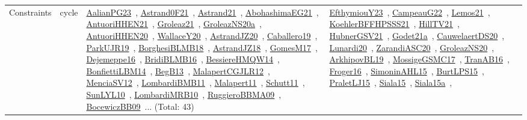 {\begin{longtable}{lp{3cm}>{\raggedright\arraybackslash}p{6cm}>{\raggedright\arraybackslash}p{6cm}>{\raggedright\arraybackslash}p{8cm}}
Constraints & cycle & \href{../works/AalianPG23.pdf}{AalianPG23}~\cite{AalianPG23}, \href{../works/Astrand0F21.pdf}{Astrand0F21}~\cite{Astrand0F21}, \href{../works/Astrand21.pdf}{Astrand21}~\cite{Astrand21}, \href{../works/AbohashimaEG21.pdf}{AbohashimaEG21}~\cite{AbohashimaEG21}, \href{../works/AntuoriHHEN21.pdf}{AntuoriHHEN21}~\cite{AntuoriHHEN21}, \href{../works/Groleaz21.pdf}{Groleaz21}~\cite{Groleaz21}, \href{../works/GroleazNS20a.pdf}{GroleazNS20a}~\cite{GroleazNS20a}, \href{../works/AntuoriHHEN20.pdf}{AntuoriHHEN20}~\cite{AntuoriHHEN20}, \href{../works/WallaceY20.pdf}{WallaceY20}~\cite{WallaceY20}, \href{../works/AstrandJZ20.pdf}{AstrandJZ20}~\cite{AstrandJZ20}, \href{../works/Caballero19.pdf}{Caballero19}~\cite{Caballero19}, \href{../works/ParkUJR19.pdf}{ParkUJR19}~\cite{ParkUJR19}, \href{../works/BorghesiBLMB18.pdf}{BorghesiBLMB18}~\cite{BorghesiBLMB18}, \href{../works/AstrandJZ18.pdf}{AstrandJZ18}~\cite{AstrandJZ18}, \href{../works/GomesM17.pdf}{GomesM17}~\cite{GomesM17}, \href{../works/Dejemeppe16.pdf}{Dejemeppe16}~\cite{Dejemeppe16}, \href{../works/BridiBLMB16.pdf}{BridiBLMB16}~\cite{BridiBLMB16}, \href{../works/BessiereHMQW14.pdf}{BessiereHMQW14}~\cite{BessiereHMQW14}, \href{../works/BonfiettiLBM14.pdf}{BonfiettiLBM14}~\cite{BonfiettiLBM14}, \href{../works/BegB13.pdf}{BegB13}~\cite{BegB13}, \href{../works/MalapertCGJLR12.pdf}{MalapertCGJLR12}~\cite{MalapertCGJLR12}, \href{../works/MenciaSV12.pdf}{MenciaSV12}~\cite{MenciaSV12}, \href{../works/LombardiBMB11.pdf}{LombardiBMB11}~\cite{LombardiBMB11}, \href{../works/Malapert11.pdf}{Malapert11}~\cite{Malapert11}, \href{../works/Schutt11.pdf}{Schutt11}~\cite{Schutt11}, \href{../works/SunLYL10.pdf}{SunLYL10}~\cite{SunLYL10}, \href{../works/LombardiMRB10.pdf}{LombardiMRB10}~\cite{LombardiMRB10}, \href{../works/RuggieroBBMA09.pdf}{RuggieroBBMA09}~\cite{RuggieroBBMA09}, \href{../works/BocewiczBB09.pdf}{BocewiczBB09}~\cite{BocewiczBB09}... (Total: 43) & \href{../works/EfthymiouY23.pdf}{EfthymiouY23}~\cite{EfthymiouY23}, \href{../works/CampeauG22.pdf}{CampeauG22}~\cite{CampeauG22}, \href{../works/Lemos21.pdf}{Lemos21}~\cite{Lemos21}, \href{../works/KoehlerBFFHPSSS21.pdf}{KoehlerBFFHPSSS21}~\cite{KoehlerBFFHPSSS21}, \href{../works/HillTV21.pdf}{HillTV21}~\cite{HillTV21}, \href{../works/HubnerGSV21.pdf}{HubnerGSV21}~\cite{HubnerGSV21}, \href{../works/Godet21a.pdf}{Godet21a}~\cite{Godet21a}, \href{../works/CauwelaertDS20.pdf}{CauwelaertDS20}~\cite{CauwelaertDS20}, \href{../works/Lunardi20.pdf}{Lunardi20}~\cite{Lunardi20}, \href{../works/ZarandiASC20.pdf}{ZarandiASC20}~\cite{ZarandiASC20}, \href{../works/GroleazNS20.pdf}{GroleazNS20}~\cite{GroleazNS20}, \href{../works/ArkhipovBL19.pdf}{ArkhipovBL19}~\cite{ArkhipovBL19}, \href{../works/MossigeGSMC17.pdf}{MossigeGSMC17}~\cite{MossigeGSMC17}, \href{../works/TranAB16.pdf}{TranAB16}~\cite{TranAB16}, \href{../works/Froger16.pdf}{Froger16}~\cite{Froger16}, \href{../works/SimoninAHL15.pdf}{SimoninAHL15}~\cite{SimoninAHL15}, \href{../works/BurtLPS15.pdf}{BurtLPS15}~\cite{BurtLPS15}, \href{../works/PraletLJ15.pdf}{PraletLJ15}~\cite{PraletLJ15}, \href{../works/Siala15.pdf}{Siala15}~\cite{Siala15}, \href{../works/Siala15a.pdf}{Siala15a}~\cite{Siala15a}, 
\end{longtable}}
